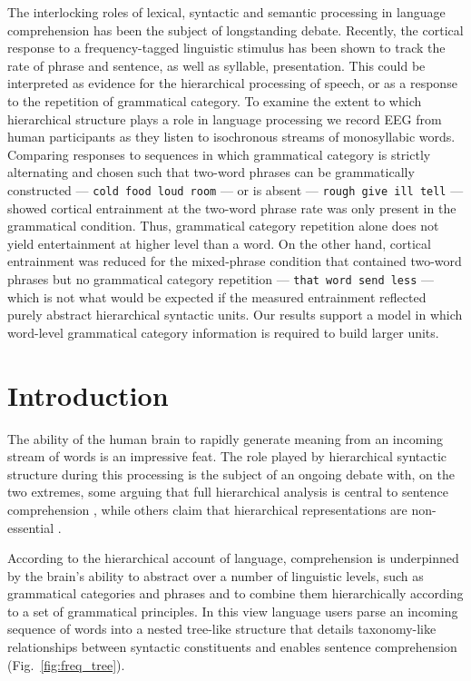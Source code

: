 \documentclass[10pt,letterpaper]{article}
\newcommand{\citet}[1]{\cite{#1}}
\begin{document}
The interlocking roles of lexical, syntactic and semantic processing
in language comprehension has been the subject of longstanding
debate. Recently, the cortical response to a frequency-tagged
linguistic stimulus has been shown to track the rate of phrase and
sentence, as well as syllable, presentation. This could be interpreted
as evidence for the hierarchical processing of speech, or as a
response to the repetition of grammatical category. To examine the
extent to which hierarchical structure plays a role in language
processing we record EEG from human participants as they listen to
isochronous streams of monosyllabic words. Comparing responses to
sequences in which grammatical category is strictly alternating and
chosen such that two-word phrases can be grammatically constructed ---
\texttt{cold food loud room} --- or is absent --- \texttt{rough give
  ill tell} --- showed cortical entrainment at the two-word phrase
rate was only present in the grammatical condition. Thus, grammatical
category repetition alone does not yield entertainment at higher level
than a word. On the other hand, cortical entrainment was reduced for
the mixed-phrase condition that contained two-word phrases but no
grammatical category repetition --- \texttt{that word send less} ---
which is not what would be expected if the measured entrainment
reflected purely abstract hierarchical syntactic units. Our results
support a model in which word-level grammatical category information
is required to build larger units.

\section*{Introduction}

The ability of the human brain to rapidly generate meaning from an
incoming stream of words is an impressive feat. The role played by
hierarchical syntactic structure during this processing is the subject
of an ongoing debate with, on the two extremes, some arguing that full
hierarchical analysis is central to sentence comprehension
\citet{Chomsky1995,BerwickEtAl2013, EveraertEtAl2015}, while others
claim that hierarchical representations are non-essential
\cite{FrankEtAl2012, FrankBod2011, FrankYang2018,
  FrankChristiansen2018}.

According to the hierarchical account of language, comprehension is
underpinned by the brain's ability to abstract over a number of
linguistic levels, such as grammatical categories and phrases and to
combine them hierarchically according to a set of grammatical
principles. In this view language users parse an incoming sequence of
words into a nested tree-like structure that details taxonomy-like
relationships between syntactic constituents and enables sentence
comprehension (Fig.~\ref{fig:freq_tree}).
\end{document}
